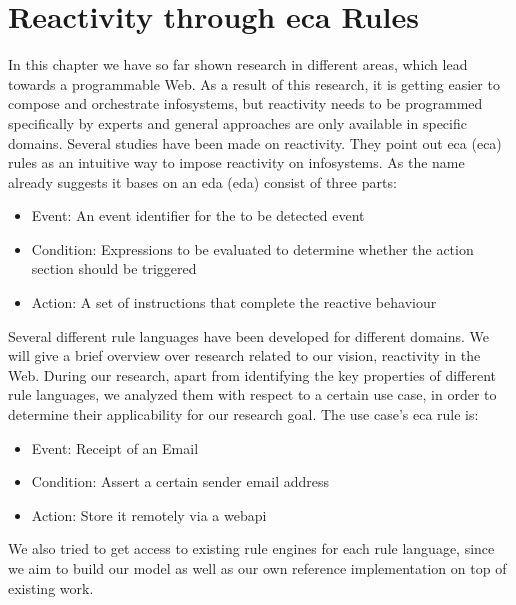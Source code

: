 \section{Reactivity through \acrlong{eca} Rules}
In this chapter we have so far shown research in different areas, which lead towards a programmable Web.
As a result of this research, it is getting easier to compose and orchestrate \textrm{\glspl{infosystem}}, but reactivity needs to be programmed specifically by experts and general approaches are only available in specific domains.
Several studies\cite{2007_AlferesR3}\cite{2005-Bry_etal-XChange.pdf}\cite{10.1007-11896548_63}\cite{papamarkos2004rdftl}\cite{2012-Paschke_etal-ReactionRuleML.pdf} have been made on reactivity.
They point out \textrm{\acrlong{eca} (\acrshort{eca})} rules as an intuitive way to impose reactivity on \textrm{\glspl{infosystem}}.
As the name already suggests it bases on an \textrm{\acrlong{eda} (\acrshort{eda})} consist of three parts:
\begin{itemize}
  \item Event: An event identifier for the to be detected event
  \item Condition: Expressions to be evaluated to determine whether the action section should be triggered
  \item Action: A set of instructions that complete the reactive behaviour
\end{itemize}

Several different rule languages have been developed for different domains.
We will give a brief overview over research related to our vision, reactivity in the Web.
During our research, apart from identifying the key properties of different rule languages, we analyzed them with respect to a certain use case, in order to determine their applicability for our research goal.
The use case's \textrm{\acrshort{eca}} rule is:
\begin{itemize}
  \item Event: Receipt of an Email
  \item Condition: Assert a certain sender email address
  \item Action: Store it remotely via a \textrm{\gls{webapi}}
\end{itemize}
We also tried to get access to existing rule engines for each rule language, since we aim to build our model as well as our own reference implementation on top of existing work.


